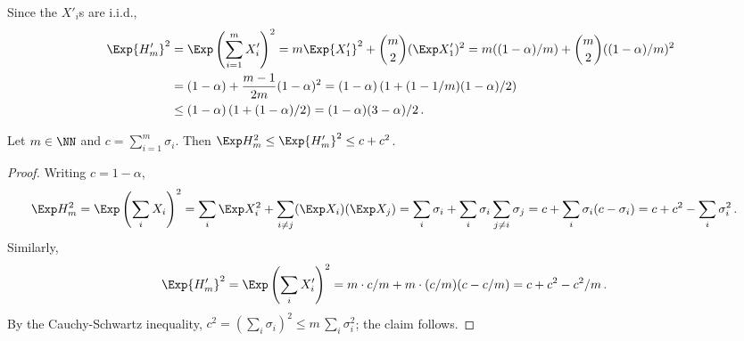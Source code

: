 


  Since the $X'_i$s are i.i.d., 
  \begin{align*}
    \Exp {H'_m}^2 
    &= \Exp \left(\sum_{i = 1}^m X'_i \right)^2
    = m \Exp {X'_1}^2 + \binom{m}{2} (\Exp X'_1)^2
    = m ((1-\alpha)/m) + \binom{m}{2} ((1 - \alpha)/m)^2 \\
    &= (1-\alpha) + \frac{m-1}{2m} (1 - \alpha)^2
    = (1-\alpha) \left( 1 + (1 - 1/m) (1 - \alpha)/2 \right) \\
    &\leq (1-\alpha) \left( 1 + (1 - \alpha)/2 \right)
    = (1-\alpha) (3 - \alpha)/2
    \,.    
  \end{align*}


  \begin{fact}\label{fact:second-moment-equal-unequal-stake}
    Let $m \in \NN$ and $c = \sum_{i = 1}^m \sigma_i$. 
    Then $\Exp H_m^2 \leq \Exp {H'_m}^2 \leq c + c^2$.
  \end{fact}
  \begin{proof}
    Writing $c = 1 - \alpha$, 
    \begin{align*}
      \Exp H_m^2 
      &=\Exp \left(\sum_i X_i\right)^2 
      = \sum_i \Exp X_i^2 + \sum_{i \neq j} (\Exp X_i)(\Exp X_j) 
      = \sum_i \sigma_i + \sum_i \sigma_i \sum_{j \neq i} \sigma_j 
      = c + \sum_i \sigma_i (c - \sigma_i) 
      = c + c^2 - \sum_i{\sigma_i^2}
      \,.      
    \end{align*}
    Similarly,
    \begin{align*}
      \Exp {H'_m}^2 
      &=\Exp \left(\sum_i X'_i\right)^2 
      = m \cdot c/m + m \cdot (c/m) (c - c/m) 
      = c + c^2 - c^2/m
      \,.      
    \end{align*}
    By the Cauchy-Schwartz inequality, 
    $
      c^2 = \left(\sum_i \sigma_i \right)^2 \leq m \, \sum_i \sigma_i^2
    $; the claim follows.
  \end{proof}

